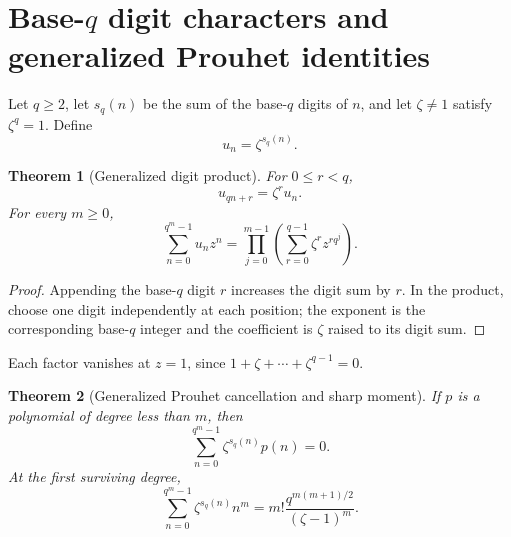 \documentclass[11pt,oneside]{article}
\numberwithin{equation}{section}
\newtheorem{theorem}{Theorem}[section]
\theoremstyle{definition}
\theoremstyle{remark}
\begin{document}
\section[Base-\texorpdfstring{\(q\)}{q} generalization]{Base-\texorpdfstring{\(q\)}{q} digit characters and generalized Prouhet identities}
\label{p1:sec:base-q}

Let \(q\ge2\), let \(s_q(n)\) be the sum of the base-\(q\) digits of \(n\),
and let \(\zeta\ne1\) satisfy \(\zeta^q=1\).  Define
\begin{equation}
  u_n=\zeta^{s_q(n)}.
  \label{p1:eq:generalized-digit-character}
\end{equation}

\begin{theorem}[Generalized digit product]
\label{p1:thm:base-q-product}
For \(0\le r<q\),
\begin{equation}
  u_{qn+r}=\zeta^ru_n.
  \label{p1:eq:base-q-recursion}
\end{equation}
For every \(m\ge0\),
\begin{equation}
  \boxed{
  \sum_{n=0}^{q^m-1}u_nz^n
  =\prod_{j=0}^{m-1}
  \left(\sum_{r=0}^{q-1}\zeta^rz^{rq^j}\right).}
  \label{p1:eq:base-q-product}
\end{equation}
\end{theorem}

\begin{proof}
Appending the base-\(q\) digit \(r\) increases the digit sum by \(r\).  In the
product, choose one digit independently at each position; the exponent is the
corresponding base-\(q\) integer and the coefficient is \(\zeta\) raised to
its digit sum.
\end{proof}

Each factor vanishes at \(z=1\), since
\(1+\zeta+\cdots+\zeta^{q-1}=0\).

\begin{theorem}[Generalized Prouhet cancellation and sharp moment]
\label{p1:thm:base-q-Prouhet}
If \(p\) is a polynomial of degree less than \(m\), then
\begin{equation}
  \boxed{
  \sum_{n=0}^{q^m-1}\zeta^{s_q(n)}p(n)=0.}
  \label{p1:eq:base-q-Prouhet}
\end{equation}
At the first surviving degree,
\begin{equation}
  \boxed{
  \sum_{n=0}^{q^m-1}\zeta^{s_q(n)}n^m
  =m!\frac{q^{m(m+1)/2}}{(\zeta-1)^m}.}
  \label{p1:eq:base-q-sharp-moment}
\end{equation}
\end{theorem}
\end{document}
